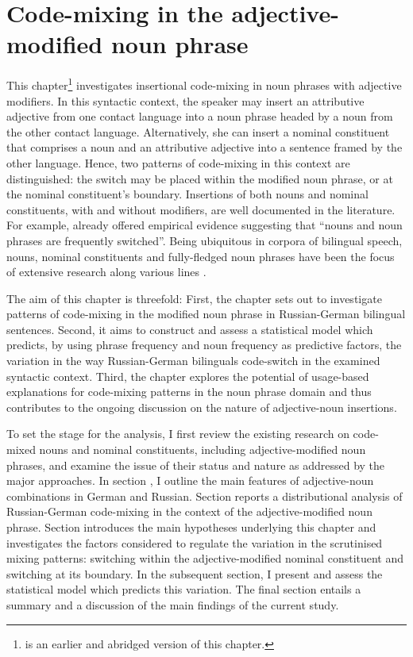 \chapter{Code-mixing in the adjective-modified noun phrase}\label{NP}

This chapter\footnote{\citet{hakimov-20} is an earlier and abridged version of this chapter.} investigates insertional code-mixing in noun phrases with adjective modifiers. In this syntactic context, the speaker may insert an attributive adjective from one contact language into a noun phrase headed by a noun from the other contact language. Alternatively, she can insert a nominal constituent that comprises a noun and an attributive adjective into a sentence framed by the other language. Hence, two patterns of code-mixing in this context are distinguished: the switch may be placed within the modified noun phrase, or at the nominal constituent's boundary. Insertions of both nouns and nominal constituents, with and without modifiers, are well documented in the literature. For example, already \citet[][604]{poplack-sometimes-1980} offered empirical evidence suggesting that ``nouns and noun phrases are frequently switched''. Being ubiquitous in corpora of bilingual speech, nouns, nominal constituents and fully-fledged noun phrases have been the focus of extensive research along various lines \citep[e.g.,][]{sankoff-et-al-1990,poplack-meechan-1995, cantone-macswan,parafita-couto-et-al}.

The aim of this chapter is threefold: First, the chapter sets out to investigate patterns of code-mixing in the modified noun phrase in Russian-German bilingual sentences. Second, it aims to construct and assess a statistical model which predicts, by using phrase frequency and noun frequency as predictive factors, the variation in the way Russian-German bilinguals code-switch in the examined syntactic context. Third, the chapter explores the potential of usage-based explanations for code-mixing patterns in the noun phrase domain and thus contributes to the ongoing discussion on the nature of adjective-noun insertions.

\begin{sloppypar}
To set the stage for the analysis, I first review the existing research on code-mixed nouns and nominal constituents, including adjective-modified noun phrases, and examine the issue of their status and nature as addressed by the major approaches. In section , I outline the main features of adjective-noun combinations in German and Russian. Section  reports a distributional analysis of Russian-German code-mixing in the context of the adjective-modified noun phrase. Section  introduces the main hypotheses underlying this chapter and investigates the factors considered to regulate the variation in the scrutinised mixing patterns: switching within the adjective-modified nominal constituent and switching at its boundary. In the subsequent section, I present and assess the statistical model which predicts this variation. The final section entails a summary and a discussion of the main findings of the current study.
\end{sloppypar}

